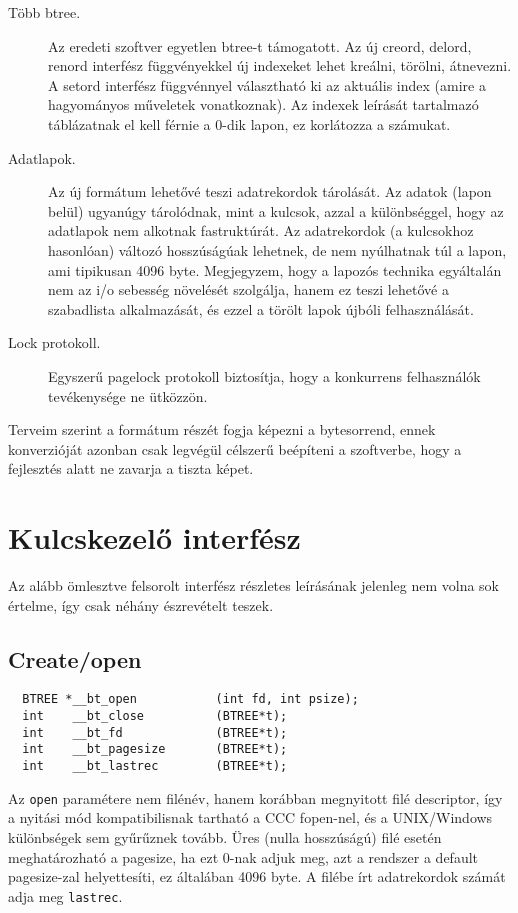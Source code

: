 \begin{description}
\item[Több btree.]
  Az eredeti szoftver egyetlen btree-t támogatott. Az új 
  creord, delord, renord interfész függvényekkel új indexeket lehet
  kreálni, törölni, átnevezni. A setord interfész függvénnyel választható
  ki az aktuális index (amire a hagyományos műveletek vonatkoznak).
  Az indexek leírását tartalmazó táblázatnak el kell férnie a 0-dik
  lapon, ez korlátozza a számukat.
\item[Adatlapok.]
  Az új formátum lehetővé teszi adatrekordok tárolását.
  Az adatok (lapon belül) ugyanúgy tárolódnak, mint a kulcsok, azzal a 
  különbséggel,  hogy az adatlapok nem alkotnak fastruktúrát.
  Az adatrekordok (a kulcsokhoz hasonlóan) változó hosszúságúak lehetnek,
  de nem nyúlhatnak túl a lapon, ami tipikusan 4096 byte.
  Megjegyzem, hogy a lapozós technika egyáltalán nem az i/o sebesség
  növelését szolgálja, hanem ez teszi lehetővé a szabadlista
  alkalmazását, és ezzel a törölt lapok újbóli felhasználását.
\item[Lock protokoll.]
  Egyszerű pagelock protokoll biztosítja, hogy a konkurrens felhasználók
  tevékenysége ne ütközzön. 
\end{description}
 
Terveim szerint a formátum részét fogja képezni a bytesorrend,
ennek konverzióját azonban csak legvégül célszerű beépíteni
a szoftverbe, hogy a fejlesztés alatt ne zavarja a tiszta képet.



\section{Kulcskezelő interfész}

Az alább ömlesztve felsorolt interfész részletes leírásának 
jelenleg nem volna sok értelme, így csak néhány észrevételt teszek.


\subsection{Create/open}

\begin{verbatim}
  BTREE *__bt_open           (int fd, int psize);
  int    __bt_close          (BTREE*t);
  int    __bt_fd             (BTREE*t);
  int    __bt_pagesize       (BTREE*t);
  int    __bt_lastrec        (BTREE*t);
\end{verbatim}

Az \verb!open! paramétere nem filénév, hanem korábban 
megnyitott filé descriptor, így a nyitási mód kompatibilisnak
tartható a CCC fopen-nel, és a UNIX/Windows különbségek sem
gyűrűznek tovább.
Üres (nulla hosszúságú) filé esetén  meghatározható a pagesize, 
ha ezt 0-nak adjuk meg, azt a rendszer a default pagesize-zal 
helyettesíti, ez általában 4096 byte.
A filébe írt adatrekordok számát adja meg \verb!lastrec!.
 

